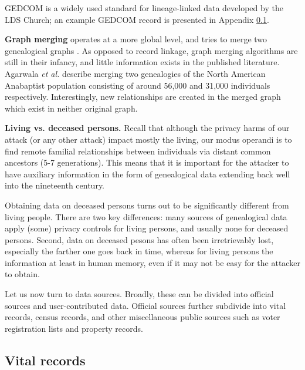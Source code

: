 \documentclass{article}
\begin{document}
GEDCOM is a widely used standard for lineage-linked data developed by the LDS Church; an example GEDCOM record is presented in Appendix \ref{}.

{\bf Graph merging} operates at a more global level, and tries to merge two genealogical graphs \cite{wilson-merge}. As opposed to record linkage, graph merging algorithms are still in their infancy, and little information exists in the published literature. Agarwala {\em et al.}\cite{anabaptist} describe merging two genealogies of the North American Anabaptist population consisting of around 56,000 and 31,000 individuals respectively. Interestingly, new relationships are created in the merged graph which exist in neither original graph. 


{\bf Living vs. deceased persons.} Recall that although the privacy harms of our attack (or any other attack) impact mostly the living, our modus operandi is to find remote familial relationships between individuals via distant common ancestors (5-7 generations). This means that it is important for the attacker to have auxiliary information in the form of genealogical data extending back well into the nineteenth century.

Obtaining data on deceased persons turns out to be significantly different from living people. There are two key differences: many sources of genealogical data apply (some) privacy controls for living persons, and usually none for deceased persons. Second, data on deceased pesons has often been irretrievably lost, especially the farther one goes back in time, whereas for living persons the information at least in human memory, even if it may not be easy for the attacker to obtain.


Let us now turn to data sources. Broadly, these can be divided into official sources and user-contributed data. Official sources further subdivide into vital records, census records, and other miscellaneous public sources such as voter registration lists and property records.

\subsection{Vital records}
\end{document}
